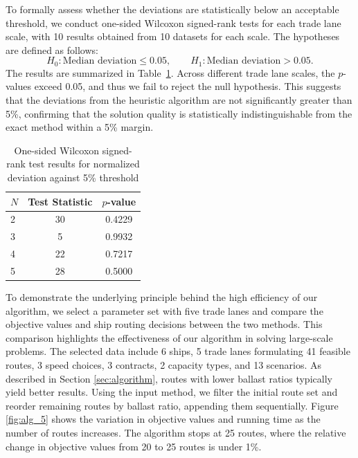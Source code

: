 \documentclass[11pt,english]{article}
\begin{document}
To formally assess whether the deviations are statistically below an acceptable threshold, we conduct one-sided Wilcoxon signed-rank tests for each trade lane scale, with 10 results obtained from 10 datasets for each scale. The hypotheses are defined as follows:
$$H_0: \text{Median deviation} \leq 0.05, \quad \quad H_1: \text{Median deviation} > 0.05.$$
The results are summarized in Table~\ref{tab:wilcoxon_test}. Across different trade lane scales, the $p$-values exceed 0.05, and thus we fail to reject the null hypothesis. This suggests that the deviations from the heuristic algorithm are not significantly greater than 5\%, confirming that the solution quality is statistically indistinguishable from the exact method within a 5\% margin.

\begin{table}[htbp]
    \centering
    \begin{tabular}{lcc}
        \toprule
        $N$ & Test Statistic & $p$-value \\
        \midrule
        2 & 30 & 0.4229 \\
        3 & 5  & 0.9932 \\
        4 & 22 & 0.7217 \\
        5 & 28 & 0.5000 \\
        \bottomrule
    \end{tabular}
    \caption{One-sided Wilcoxon signed-rank test results for normalized deviation against 5\% threshold}
    \label{tab:wilcoxon_test}
\end{table}

To demonstrate the underlying principle behind the high efficiency of our algorithm, we select a parameter set with five trade lanes and compare the objective values and ship routing decisions between the two methods. This comparison highlights the effectiveness of our algorithm in solving large-scale problems. The selected data include 6 ships, 5 trade lanes formulating 41 feasible routes, 3 speed choices, 3 contracts, 2 capacity types, and 13 scenarios. As described in Section \ref{sec:algorithm}, routes with lower ballast ratios typically yield better results. Using the input method, we filter the initial route set and reorder remaining routes by ballast ratio, appending them sequentially. Figure \ref{fig:alg_5} shows the variation in objective values and running time as the number of routes increases. The algorithm stops at 25 routes, where the relative change in objective values from 20 to 25 routes is under 1\%.
\end{document}
